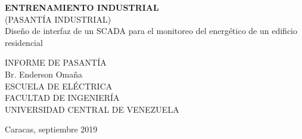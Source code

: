 \thispagestyle{empty} 
\begin{center}
    \textbf{ENTRENAMIENTO INDUSTRIAL}\\
    (PASANTÍA INDUSTRIAL)\\

    \vspace{5cm}
    Diseño de interfaz de un SCADA para el monitoreo del 
    energético de un edificio residencial
\end{center}    
    \vspace{5cm}
    \hspace{6cm}INFORME DE PASANTÍA\\
    \hspace{6cm}Br. Enderson Omaña\\
    \hspace{6cm}ESCUELA DE ELÉCTRICA\\
    \hspace{6cm}FACULTAD DE INGENIERÍA\\
    \hspace{6cm}UNIVERSIDAD CENTRAL DE VENEZUELA\\
    \vspace{4cm}
    \begin{center}
        Caracas, septiembre 2019
    \end{center}
    \newpage
